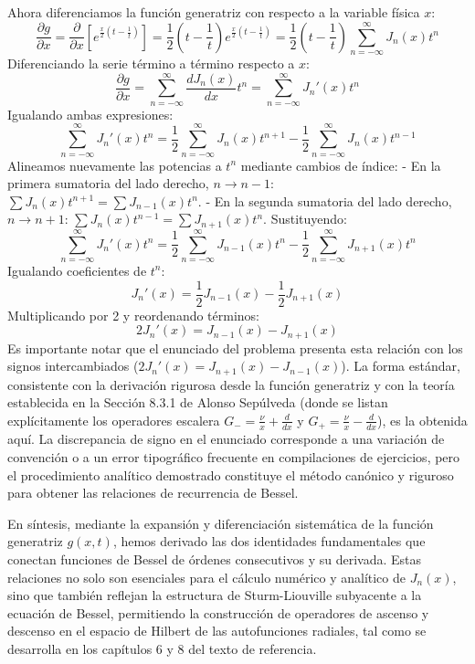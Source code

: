 \documentclass[a4paper]{article}
\begin{document}
Ahora diferenciamos la función generatriz con respecto a la variable física $x$:
$$\frac{\partial g}{\partial x} = \frac{\partial}{\partial x} \left[ e^{\frac{x}{2}\left(t - \frac{1}{t}\right)} \right] = \frac{1}{2}\left(t - \frac{1}{t}\right) e^{\frac{x}{2}\left(t - \frac{1}{t}\right)} = \frac{1}{2}\left(t - \frac{1}{t}\right) \sum_{n=-\infty}^{\infty} J_n(x) t^n$$
Diferenciando la serie término a término respecto a $x$:
$$\frac{\partial g}{\partial x} = \sum_{n=-\infty}^{\infty} \frac{dJ_n(x)}{dx} t^n = \sum_{n=-\infty}^{\infty} J_n'(x) t^n$$
Igualando ambas expresiones:
$$\sum_{n=-\infty}^{\infty} J_n'(x) t^n = \frac{1}{2} \sum_{n=-\infty}^{\infty} J_n(x) t^{n+1} - \frac{1}{2} \sum_{n=-\infty}^{\infty} J_n(x) t^{n-1}$$
Alineamos nuevamente las potencias a $t^n$ mediante cambios de índice:
- En la primera sumatoria del lado derecho, $n \to n-1$: $\sum J_n(x) t^{n+1} = \sum J_{n-1}(x) t^n$.
- En la segunda sumatoria del lado derecho, $n \to n+1$: $\sum J_n(x) t^{n-1} = \sum J_{n+1}(x) t^n$.
Sustituyendo:
$$\sum_{n=-\infty}^{\infty} J_n'(x) t^n = \frac{1}{2} \sum_{n=-\infty}^{\infty} J_{n-1}(x) t^n - \frac{1}{2} \sum_{n=-\infty}^{\infty} J_{n+1}(x) t^n$$
Igualando coeficientes de $t^n$:
$$J_n'(x) = \frac{1}{2} J_{n-1}(x) - \frac{1}{2} J_{n+1}(x)$$
Multiplicando por 2 y reordenando términos:
$$2J_n'(x) = J_{n-1}(x) - J_{n+1}(x)$$
Es importante notar que el enunciado del problema presenta esta relación con los signos intercambiados ($2J_n'(x) = J_{n+1}(x) - J_{n-1}(x)$). La forma estándar, consistente con la derivación rigurosa desde la función generatriz y con la teoría establecida en la Sección 8.3.1 de Alonso Sepúlveda (donde se listan explícitamente los operadores escalera $G_- = \frac{\nu}{x} + \frac{d}{dx}$ y $G_+ = \frac{\nu}{x} - \frac{d}{dx}$), es la obtenida aquí. La discrepancia de signo en el enunciado corresponde a una variación de convención o a un error tipográfico frecuente en compilaciones de ejercicios, pero el procedimiento analítico demostrado constituye el método canónico y riguroso para obtener las relaciones de recurrencia de Bessel.

En síntesis, mediante la expansión y diferenciación sistemática de la función generatriz $g(x,t)$, hemos derivado las dos identidades fundamentales que conectan funciones de Bessel de órdenes consecutivos y su derivada. Estas relaciones no solo son esenciales para el cálculo numérico y analítico de $J_n(x)$, sino que también reflejan la estructura de Sturm-Liouville subyacente a la ecuación de Bessel, permitiendo la construcción de operadores de ascenso y descenso en el espacio de Hilbert de las autofunciones radiales, tal como se desarrolla en los capítulos 6 y 8 del texto de referencia.
\end{document}
